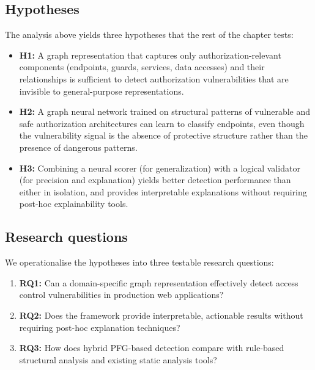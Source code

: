\subsection{Hypotheses}
\label{sec:det-hypotheses}

The analysis above yields three hypotheses that the rest of the chapter
tests:
\begin{itemize}%
  \item \textbf {H1:}
  A graph representation that captures only authorization-relevant
  components (endpoints, guards, services, data accesses) and their
  relationships is sufficient to detect authorization vulnerabilities that
  are invisible to general-purpose representations.

  \item \textbf {H2:}
  A graph neural network trained on structural patterns of vulnerable and
  safe authorization architectures can learn to classify endpoints, even
  though the vulnerability signal is the absence of protective structure
  rather than the presence of dangerous patterns.

  \item \textbf {H3:}
  Combining a neural scorer (for generalization) with a logical validator
  (for precision and explanation) yields better detection performance than
  either in isolation, and provides interpretable explanations without
  requiring post-hoc explainability tools.
\end{itemize}

\subsection{Research questions}
\label{sec:det-rqs}

We operationalise the hypotheses into three testable research questions:
\begin{enumerate}
    \item \textbf{RQ1:}
    Can a domain-specific graph representation effectively detect access
    control vulnerabilities in production web applications?
    \item \textbf{RQ2:}
    Does the framework provide interpretable, actionable results without
    requiring post-hoc explanation techniques?
    \item \textbf{RQ3:}
    How does hybrid PFG-based detection compare with rule-based structural
    analysis and existing static analysis tools?
\end{enumerate}


